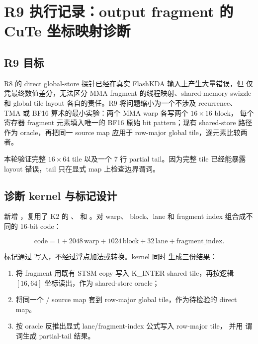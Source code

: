 \section{R9 执行记录：output fragment 的 CuTe 坐标映射诊断}

\subsection{R9 目标}

R8 的 direct global-store 探针已经在真实 FlashKDA 输入上产生大量错误，但
仅凭最终数值差分，无法区分 MMA fragment 的线程映射、shared-memory swizzle
和 global tile layout 各自的责任。R9 将问题缩小为一个不涉及 recurrence、
TMA 或 BF16 算术的最小实验：两个 MMA warp 各写两个 \(16\times16\) block，
每个寄存器 fragment 元素填入唯一的 BF16 原始 bit pattern；现有
 shared-store 路径作为 oracle，再把同一 source
map 应用于 row-major global tile，逐元素比较两者。

本轮验证完整 \(16\times64\) tile 以及一个 7 行 partial tail。因为完整 tile
已经能暴露 layout 错误，tail 只在显式 map 上检查边界谓词。

\subsection{诊断 kernel 与标记设计}

新增 ，复用了 K2 的
、
 和
。对 warp、
block、lane 和 fragment index 组合成不同的 16-bit code：

\[
  \mathrm{code}=1+2048\,\mathrm{warp}+1024\,\mathrm{block}
    +32\,\mathrm{lane}+\mathrm{fragment\_index}.
\]

标记通过  写入，不经过浮点加法或转换。kernel 同时
生成三份结果：

\begin{enumerate}
  \item 将 fragment 用既有 STSM copy 写入 K\_INTER shared tile，再按逻辑
        \([16,64]\) 坐标读出，作为 shared-store oracle；
  \item 将同一个 / source map 套到
        row-major global tile，作为待检验的 direct map。
  \item 按 oracle 反推出显式 lane/fragment-index 公式写入 row-major tile，
        并用  谓词生成 partial-tail 结果。
\end{enumerate}

